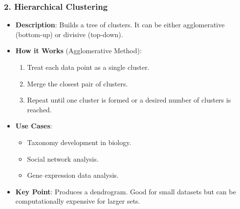 \documentclass[aspectratio=169]{beamer}
\begin{document}
\begin{frame}[fragile]
    \frametitle{2. Hierarchical Clustering}
    \begin{itemize}
        \item \textbf{Description}: Builds a tree of clusters. It can be either agglomerative (bottom-up) or divisive (top-down).
        \item \textbf{How it Works} (Agglomerative Method):
        \begin{enumerate}
            \item Treat each data point as a single cluster.
            \item Merge the closest pair of clusters.
            \item Repeat until one cluster is formed or a desired number of clusters is reached.
        \end{enumerate}
        \item \textbf{Use Cases}:
        \begin{itemize}
            \item Taxonomy development in biology.
            \item Social network analysis.
            \item Gene expression data analysis.
        \end{itemize}
        \item \textbf{Key Point}: Produces a dendrogram. Good for small datasets but can be computationally expensive for larger sets.
    \end{itemize}
\end{frame}
\end{document}
